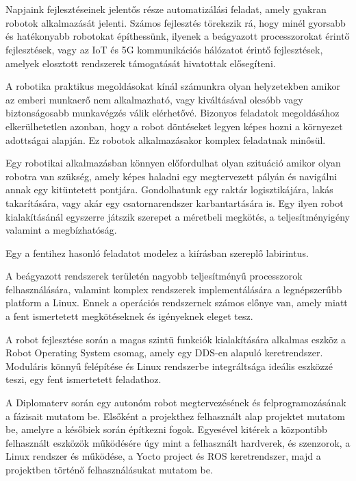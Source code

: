 \chapter{\bevezetes}

Napjaink fejlesztéseinek jelentős része automatizálási feladat, amely gyakran robotok alkalmazását jelenti. Számos
fejlesztés törekszik rá, hogy minél gyorsabb és hatékonyabb robotokat építhessünk, ilyenek a beágyazott processzorokat
érintő fejlesztések, vagy az IoT és 5G kommunikációs hálózatot érintő fejlesztések, amelyek elosztott rendszerek
támogatását hivatottak elősegíteni.

A robotika praktikus megoldásokat kínál számunkra olyan helyzetekben amikor az emberi munkaerő nem alkalmazható,
vagy kiváltásával olcsóbb vagy biztonságosabb munkavégzés válik elérhetővé. Bizonyos feladatok megoldásához
elkerülhetetlen azonban, hogy a robot döntéseket legyen képes hozni a környezet adottságai alapján.
Ez robotok alkalmazásakor komplex feladatnak minősül.

\medskip

Egy robotikai alkalmazásban könnyen előfordulhat olyan szituáció amikor olyan robotra van szükség, amely képes
haladni egy megtervezett pályán és navigálni annak egy kitüntetett pontjára.
Gondolhatunk egy raktár logisztikájára, lakás takarítására, vagy akár egy csatornarendszer karbantartására is.
Egy ilyen robot kialakításánál egyszerre játszik szerepet a méretbeli megkötés, a teljesítményigény valamint a
megbízhatóság.

Egy a fentihez hasonló feladatot modelez a kiírásban szereplő labirintus.

\medskip

A beágyazott rendszerek területén nagyobb teljesítményű processzorok felhasználására, valamint komplex rendszerek
implementálására a legnépszerűbb platform a Linux. Ennek a operációs rendszernek számos előnye van, amely miatt a
fent ismertetett megkötéseknek és igényeknek eleget tesz.

A robot fejlesztése során a magas szintü funkciók kialakítására alkalmas eszköz a Robot Operating System csomag,
amely egy DDS-en alapuló keretrendszer. Moduláris könnyű felépítése és Linux rendszerbe integráltsága ideális
eszközzé teszi, egy fent ismertetett feladathoz.

A Diplomaterv során egy autonóm robot megtervezésének és felprogramozásának a fázisait mutatom be. Elsőként
a projekthez felhasznált alap projektet mutatom be, amelyre a későbiek során építkezni fogok.
Egyesével kitérek a központibb felhasznált eszközök működésére úgy mint a felhasznált hardverek, és szenzorok,
a Linux rendszer és működése, a Yocto project és ROS keretrendszer, majd a projektben történő
felhasználásukat mutatom be.







